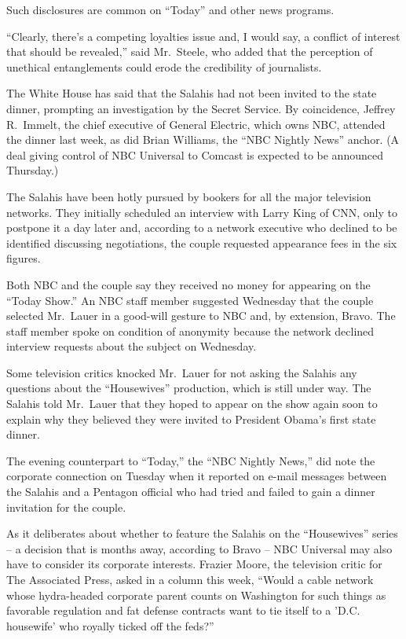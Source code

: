 ﻿\documentclass[12pt]{article}
\begin{document}
Such disclosures are common on ``Today'' and other news programs.

``Clearly, there's a competing loyalties issue and, I would say, a conflict of interest that should
be revealed,'' said Mr.~Steele, who added that the perception of unethical entanglements could erode
the credibility of journalists.

The White House has said that the Salahis had not been invited to the state dinner, prompting an
investigation by the Secret Service. By coincidence, Jeffrey R.~Immelt, the chief executive of
General Electric, which owns NBC, attended the dinner last week, as did Brian Williams, the ``NBC
Nightly News'' anchor. (A deal giving control of NBC Universal to Comcast is expected to be
announced Thursday.)

The Salahis have been hotly pursued by bookers for all the major television networks. They initially
scheduled an interview with Larry King of CNN, only to postpone it a day later and, according to a
network executive who declined to be identified discussing negotiations, the couple requested
appearance fees in the six figures.

Both NBC and the couple say they received no money for appearing on the ``Today Show.'' An NBC staff
member suggested Wednesday that the couple selected Mr.~Lauer in a good-will gesture to NBC and, by
extension, Bravo. The staff member spoke on condition of anonymity because the network declined
interview requests about the subject on Wednesday.

Some television critics knocked Mr.~Lauer for not asking the Salahis any questions about the
``Housewives'' production, which is still under way. The Salahis told Mr.~Lauer that they hoped to
appear on the show again soon to explain why they believed they were invited to President Obama's
first state dinner.

The evening counterpart to ``Today,'' the ``NBC Nightly News,'' did note the corporate connection on
Tuesday when it reported on e-mail messages between the Salahis and a Pentagon official who had
tried and failed to gain a dinner invitation for the couple.

As it deliberates about whether to feature the Salahis on the ``Housewives'' series -- a decision
that is months away, according to Bravo -- NBC Universal may also have to consider its corporate
interests. Frazier Moore, the television critic for The Associated Press, asked in a column this
week, ``Would a cable network whose hydra-headed corporate parent counts on Washington for such
things as favorable regulation and fat defense contracts want to tie itself to a 'D.C. housewife'
who royally ticked off the feds?''
\end{document}
